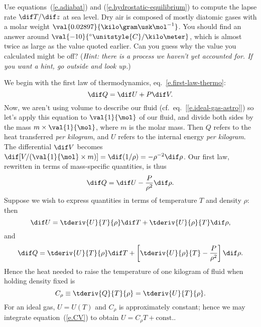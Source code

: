 \begin{exercisebox}
Use equations~(\ref{e.adiabat}) and (\ref{e.hydrostatic-equilibrium}) to compute the lapse rate $\dif T/\dif z$ at sea level.  Dry air is composed of mostly diatomic gases with a molar weight $\val{0.02897}{\kilo\gram\usk\mol^{-1}}$. You should find an answer around $\val{-10}{^{\circ}\unitstyle{C}/\kilo\meter}$, which is almost twice as large as the value quoted earlier.  Can you guess why the value you calculated might be off? (\emph{Hint: there is a process we haven't yet accounted for.  If you want a hint, go outside and look up.})
\end{exercisebox}

\begin{sidebar}
We begin with the first law of thermodynamics, eq.~\ref{e.first-law-thermo}:
\[
\dif Q = \dif U + P\dif V.
\]
Now, we aren't using volume to describe our fluid (cf.\ eq.~[\ref{e.ideal-gas-astro}]) so let's apply this equation to $\val{1}{\mol}$ of our fluid, and divide both sides by the mass $m\times\val{1}{\mol}$, where $m$ is the molar mass. Then $Q$ refers to the heat transferred \emph{per kilogram}, and $U$ refers to the internal energy \emph{per kilogram}. The differential $\dif V$ becomes $\dif [V/(\val{1}{\mol}\times m)] = \dif(1/\rho) = -\rho^{-2}\dif\rho$.  Our first law, rewritten in terms of mass-specific quantities, is thus
\begin{equation}\label{e.first-law-thermo-astro}
	\dif Q = \dif U -\frac{P}{\rho^{2}}\dif \rho.
\end{equation}
Suppose we wish to express quantities in terms of temperature $T$ and density $\rho$: then
\[ \dif U = \tderiv{U}{T}{\rho}\dif T + \tderiv{U}{\rho}{T}\dif \rho, \]
and
\[ \dif Q = \tderiv{U}{T}{\rho}\dif T + \left[\tderiv{U}{\rho}{T} - \frac{P}{\rho^{2}}\right]\dif \rho. \]
Hence the heat needed to raise the temperature of one kilogram of fluid when holding density fixed is
\begin{equation}\label{e.CV}
C_{\rho} \equiv \tderiv{Q}{T}{\rho} = \tderiv{U}{T}{\rho}.
\end{equation}
For an ideal gas, $U = U(T)$ and $C_{\rho}$ is approximately constant; hence we may integrate equation~(\ref{e.CV}) to obtain $U = C_{\rho}T + \textrm{const.}$.


\end{sidebar}
